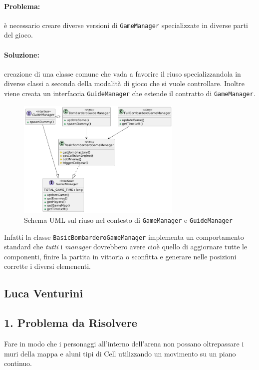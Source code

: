 \documentclass[a4paper,12pt]{report}
\begin{document}
\paragraph{Problema:}è necessario creare diverse versioni di \texttt{GameManager} specializzate in diverse parti del gioco. 
\paragraph{Soluzione:} creazione di una classe comune che vada a favorire il riuso specializzandola in diverse classi a seconda della modalità di gioco che si vuole controllare. Inoltre viene creata un interfaccia \texttt{GuideManager} che estende il contratto di \texttt{GameManager}. 

\begin{figure}[H]
    \centering{}
    \includegraphics[width=0.7\textwidth]{img/managers.png}
    \caption{Schema UML sul riuso nel contesto di \texttt{GameManager} e \texttt{GuideManager}}
    \label{img:mapgenerator-gamemap}
\end{figure}

Infatti la classe \texttt{BasicBombarderoGameManager} implementa un comportamento standard che \textit{tutti} i \textit{manager} dovrebbero avere cioè quello di aggiornare tutte le componenti, finire la partita in vittoria o sconfitta e generare nelle posizioni corrette i diversi elemenenti. 

\subsection{Luca Venturini}
\subsection*{1. Problema da Risolvere}

\par
Fare in modo che i personaggi all'interno dell'arena non possano oltrepassare i muri della mappa e aluni tipi di Cell utilizzando un movimento su un piano continuo.
%
\end{document}

